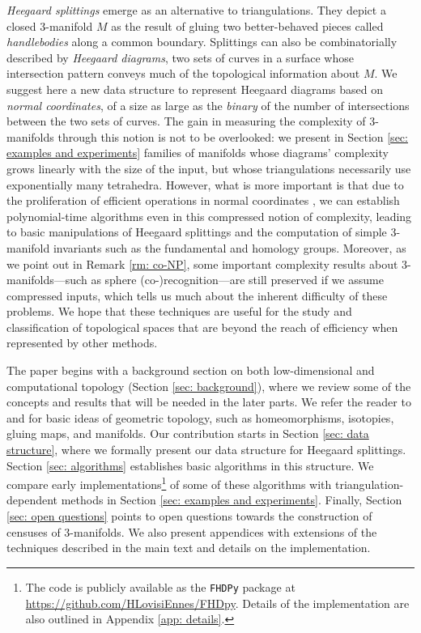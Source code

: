\documentclass[11pt]{amsart}
\numberwithin{equation}{section}
\theoremstyle{plain}
\theoremstyle{definition}
\begin{document}
\emph{Heegaard splittings} emerge as an alternative to triangulations.
They depict a closed 3-manifold $M$ as the result of gluing two better-behaved pieces called \emph{handlebodies} along a common boundary. 
Splittings can also be combinatorially described by \emph{Heegaard diagrams}, two sets of curves in a surface whose intersection pattern conveys much of the topological information about $M$.
We suggest here a new data structure to represent Heegaard diagrams based on \emph{normal coordinates}, of a size as large as the \emph{binary} of the number of intersections between the two sets of curves. 
The gain in measuring the complexity of 3-manifolds through this notion is not to be overlooked: we present in Section \ref{sec: examples and experiments} families of manifolds whose diagrams' complexity grows linearly with the size of the input, but whose triangulations necessarily use exponentially many tetrahedra. 
However, what is more important is that due to the proliferation of efficient operations in normal coordinates \cite{Erickson2013, lackenby2024some, schaefer2002algorithms, schaefer2008computing, Stefankovic}, we can establish polynomial-time algorithms even in this compressed notion of complexity, leading to basic manipulations of Heegaard splittings and the computation of simple 3-manifold invariants such as the fundamental and homology groups. 
Moreover, as we point out in Remark \ref{rm: co-NP}, some important complexity results about 3-manifolds---such as sphere (co-)recognition---are still preserved if we assume compressed inputs, which tells us much about the inherent difficulty of these problems.
We hope that these techniques are useful for the study and classification of topological spaces that are beyond the reach of efficiency when represented by other methods.

The paper begins with a background section on both low-dimensional and computational topology (Section \ref{sec: background}), where we review some of the concepts and results that will be needed in the later parts. 
We refer the reader to \cite{schultens2014introduction} and \cite{singer2015lecture} for basic ideas of geometric topology, such as homeomorphisms, isotopies, gluing maps, and manifolds.
Our contribution starts in Section \ref{sec: data structure}, where we formally present our data structure for Heegaard splittings. 
Section \ref{sec: algorithms} establishes basic algorithms in this structure.
We compare early implementations\footnote{The code is publicly available as the \texttt{FHDPy} package at \url{https://github.com/HLovisiEnnes/FHDpy}. Details of the implementation are also outlined in Appendix \ref{app: details}.} of some of these algorithms with triangulation-dependent methods in Section \ref{sec: examples and experiments}.
Finally, Section \ref{sec: open questions} points to open questions towards the construction of censuses of 3-manifolds.
We also present appendices with extensions of the techniques described in the main text and details on the implementation.
\end{document}
